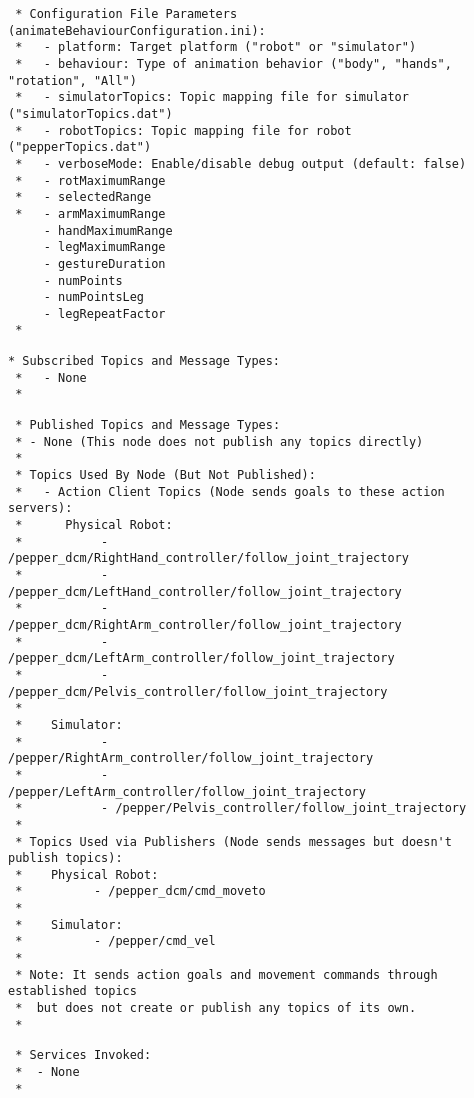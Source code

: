 \documentclass{CSSRforAfrica}
\newcommand{\checkboxChecked}{\fbox{\ding{51}}} %
\begin{document}
\begin{description}
\item[\checkboxChecked] 
 {\small 
\begin{verbatim}
 * Configuration File Parameters (animateBehaviourConfiguration.ini):
 *   - platform: Target platform ("robot" or "simulator")
 *   - behaviour: Type of animation behavior ("body", "hands", "rotation", "All")
 *   - simulatorTopics: Topic mapping file for simulator ("simulatorTopics.dat")
 *   - robotTopics: Topic mapping file for robot ("pepperTopics.dat")
 *   - verboseMode: Enable/disable debug output (default: false)  
 *   - rotMaximumRange	 
 *   - selectedRange
 *   - armMaximumRange		
     - handMaximumRange				
     - legMaximumRange				
     - gestureDuration				
     - numPoints						
     - numPointsLeg				
     - legRepeatFactor			
 * 
\end{verbatim}}

\item[\checkboxChecked] 
 {\small 
\begin{verbatim}
* Subscribed Topics and Message Types:
 *   - None
 * 
\end{verbatim}}

\newpage
\item[\checkboxChecked] 
 {\small 
\begin{verbatim}                    
 * Published Topics and Message Types:
 * - None (This node does not publish any topics directly)
 * 
 * Topics Used By Node (But Not Published):
 *   - Action Client Topics (Node sends goals to these action servers):
 *      Physical Robot:
 *           - /pepper_dcm/RightHand_controller/follow_joint_trajectory
 *           - /pepper_dcm/LeftHand_controller/follow_joint_trajectory
 *           - /pepper_dcm/RightArm_controller/follow_joint_trajectory
 *           - /pepper_dcm/LeftArm_controller/follow_joint_trajectory
 *           - /pepper_dcm/Pelvis_controller/follow_joint_trajectory
 * 
 *    Simulator:
 *           - /pepper/RightArm_controller/follow_joint_trajectory
 *           - /pepper/LeftArm_controller/follow_joint_trajectory
 *           - /pepper/Pelvis_controller/follow_joint_trajectory
 * 
 * Topics Used via Publishers (Node sends messages but doesn't publish topics):
 *    Physical Robot:
 *          - /pepper_dcm/cmd_moveto
 * 
 *    Simulator:
 *          - /pepper/cmd_vel
 * 
 * Note: It sends action goals and movement commands through established topics
 *  but does not create or publish any topics of its own.
 * 
\end{verbatim}}

\item[\checkboxChecked] 
 {\small 
\begin{verbatim}                    
 * Services Invoked:
 *  - None
 * 
\end{verbatim}}


\end{description}
\end{document}
